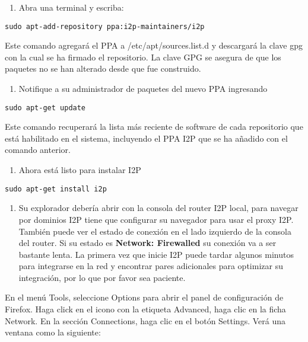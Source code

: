 \documentclass[10pt,a5paper,twoside,,]{book}
\providecommand{\tightlist}{%
  \setlength{\itemsep}{0pt}\setlength{\parskip}{0pt}}
\begin{document}
\begin{enumerate}
\def\labelenumi{\arabic{enumi}.}
\tightlist
\item
  Abra una terminal y escriba:
\end{enumerate}

\texttt{sudo\ apt-add-repository\ ppa:i2p-maintainers/i2p}

Este comando agregará el PPA a /etc/apt/sources.list.d y descargará la
clave gpg con la cual se ha firmado el repositorio. La clave GPG se
asegura de que los paquetes no se han alterado desde que fue construido.

\begin{enumerate}
\def\labelenumi{\arabic{enumi}.}
\setcounter{enumi}{1}
\tightlist
\item
  Notifique a su administrador de paquetes del nuevo PPA ingresando
\end{enumerate}

\texttt{sudo\ apt-get\ update}

Este comando recuperará la lista más reciente de software de cada
repositorio que está habilitado en el sistema, incluyendo el PPA I2P que
se ha añadido con el comando anterior.

\begin{enumerate}
\def\labelenumi{\arabic{enumi}.}
\setcounter{enumi}{2}
\tightlist
\item
  Ahora está listo para instalar I2P
\end{enumerate}

\texttt{sudo\ apt-get\ install\ i2p}

\begin{enumerate}
\def\labelenumi{\arabic{enumi}.}
\setcounter{enumi}{3}
\tightlist
\item
  Su explorador debería abrir con la consola del router I2P local, para
  navegar por dominios I2P tiene que configurar su navegador para usar
  el proxy I2P. También puede ver el estado de conexión en el lado
  izquierdo de la consola del router. Si su estado es \textbf{Network:
  Firewalled} su conexión va a ser bastante lenta. La primera vez que
  inicie I2P puede tardar algunos minutos para integrarse en la red y
  encontrar pares adicionales para optimizar su integración, por lo que
  por favor sea paciente.
\end{enumerate}

En el menú Tools, seleccione Options para abrir el panel de
configuración de Firefox. Haga click en el icono con la etiqueta
Advanced, haga clic en la ficha Network. En la sección Connections, haga
clic en el botón Settings. Verá una ventana como la siguiente:
\end{document}
